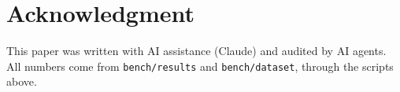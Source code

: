 \documentclass[conference]{IEEEtran}
\begin{document}
\section*{Acknowledgment}
This paper was written with AI assistance (Claude) and audited by AI agents. All numbers come from
\texttt{bench/results} and \texttt{bench/dataset}, through the scripts above.



\end{document}

